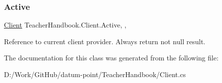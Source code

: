\subsubsection{\texorpdfstring{Active}{Active}}
{\footnotesize\ttfamily \mbox{\hyperlink{class_teacher_handbook_1_1_client}{Client}} Teacher\+Handbook.\+Client.\+Active\hspace{0.3cm}{\ttfamily [static]}, {\ttfamily [get]}, {}}



Reference to current client provider. Always return not null result. 



The documentation for this class was generated from the following file\+:\begin{DoxyCompactItemize}
\item 
D\+:/\+Work/\+Git\+Hub/datum-\/point/\+Teacher\+Handbook/Client.\+cs\end{DoxyCompactItemize}
